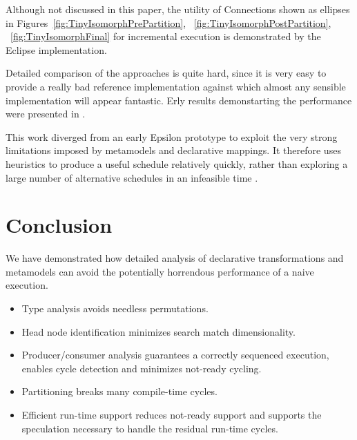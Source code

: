 \documentclass{jot}
\begin{document}

Although not discussed in this paper, the utility of Connections shown as ellipses in Figures~\ref{fig:TinyIsomorphPrePartition}, ~\ref{fig:TinyIsomorphPostPartition}, ~\ref{fig:TinyIsomorphFinal} for incremental execution is demonstrated by the Eclipse implementation.

Detailed comparison of the approaches is quite hard, since it is very easy to provide a really bad reference implementation against which almost any sensible implementation will appear fantastic. Erly results demonstarting the performance were presented in \cite{Willink-EXE2016}.

This work diverged from an early Epsilon prototype to exploit the very strong limitations imposed by metamodels and declarative mappings. It therefore uses heuristics to produce a useful schedule relatively quickly, rather than exploring a large number of alternative schedules in an infeasible time \cite{Horacio-planning}.



\section{Conclusion}\label{Conclusion}

We have demonstrated how detailed analysis of declarative transformations and metamodels can avoid the potentially horrendous performance of a naive execution.

\begin{itemize}
	\item Type analysis avoids needless permutations.
	\item Head node identification minimizes search match dimensionality.
	\item Producer/consumer analysis guarantees a correctly sequenced execution, enables cycle detection and minimizes not-ready cycling.
	\item Partitioning breaks many compile-time cycles.
	\item Efficient run-time support reduces not-ready support and supports the speculation necessary to handle the residual run-time cycles.
\end{itemize}
\end{document}
